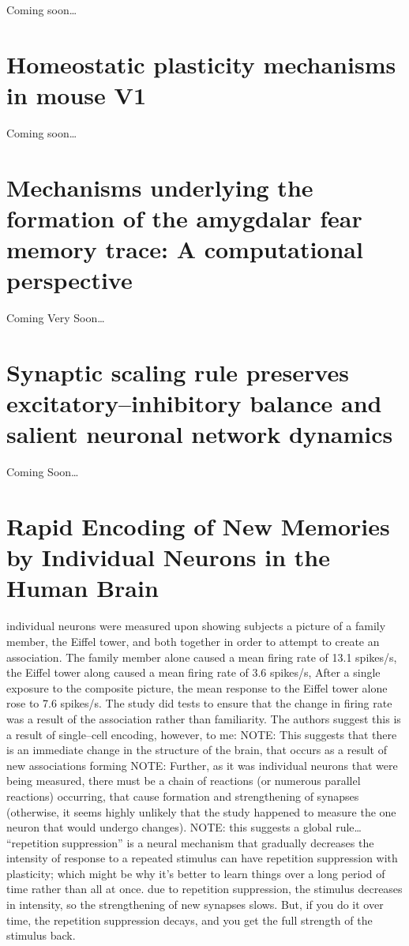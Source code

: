 \documentclass[11pt, a4paper, oneside]{article}   	%
\begin{document}
Coming soon\ldots

\section{Homeostatic plasticity mechanisms in mouse V1 \cite{Kaneko2017}}

Coming soon\ldots

\section{Mechanisms underlying the formation of the amygdalar fear memory trace: A computational perspective \cite{Feng2016}}

Coming Very Soon\ldots

\section{Synaptic scaling rule preserves excitatory–inhibitory balance and salient neuronal network dynamics \cite{Barral2016}}

Coming Soon\ldots


\section{Rapid Encoding of New Memories by Individual Neurons in the Human Brain \cite{Ison2015}}

\begin{outline}
    \point individual neurons were measured upon showing subjects a picture of a family member, the Eiffel tower, and both together in order to attempt to create an association. The family member alone caused a mean firing rate of 13.1 spikes/s, the Eiffel tower along caused a mean firing rate of 3.6 spikes/s, After a single exposure to the composite picture, the mean response to the Eiffel tower alone rose to 7.6 spikes/s. The study did tests to ensure that the change in firing rate was a result of the association rather than familiarity.  
    \point The authors suggest this is a result of single--cell encoding, however, to me:
        \subpoint NOTE: This suggests that there is an immediate change in the structure of the brain, that occurs as a result of new associations forming
        \subpoint NOTE: Further, as it was individual neurons that were being measured, there must be a chain of reactions (or numerous parallel reactions) occurring, that cause formation and strengthening of synapses (otherwise, it seems highly unlikely that the study happened to measure the one neuron that would undergo changes).
            \subsubpoint NOTE: this suggests a global rule\ldots
\point ``repetition suppression'' is a neural mechanism that gradually decreases the intensity of response to a repeated stimulus
    \subpoint can have repetition suppression with plasticity; which might be why it's better to learn things over a long period of time rather than all at once. due to repetition suppression, the stimulus decreases in intensity, so the strengthening of new synapses slows. But, if you do it over time, the repetition suppression decays, and you get the full strength of the stimulus back.
\end{outline}
\end{document}
